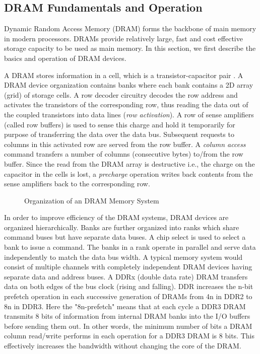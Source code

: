 \subsection{DRAM Fundamentals and Operation} \label{dram-background}
Dynamic Random Access Memory (DRAM) forms the backbone of main memory in modern processors. DRAMs provide relatively large, fast and cost effective storage capacity to be used as main memory. In this section, we first describe the basics and operation of DRAM  devices.

\par A DRAM stores information in a cell, which is a transistor-capacitor pair \cite{dram-book}. A DRAM device organization contains banks where each bank contains a 2D array (grid) of storage cells. A row decoder circuitry decodes the row address and activates the transistors of the corresponding row, thus reading the data out of the coupled transistors into data lines (\textit{row activation}). A row of sense amplifiers (called row buffers) is used to sense this charge and hold it temporarily for purpose of transferring the data over the data bus. Subsequent requests to columns in this activated row are served from the row buffer. A \textit{column access} command transfers a number of columns (consecutive bytes) to/from the row buffer. Since the read from the DRAM array is destructive i.e., the charge on the capacitor in the cells is lost, a \textit{precharge} operation writes back contents from the sense amplifiers back to the corresponding row.
\begin{figure}[!htb]
	\centering
	\def\svgwidth{\columnwidth}
	
	\caption{Organization of an DRAM Memory System}
	\label{fig:dram-basics}
\end{figure}
\par In order to improve efficiency of the DRAM systems, DRAM devices are organized hierarchically. Banks are further organized into ranks which share command buses but have separate data buses. A chip select is used to select a bank to issue a command.  The banks in a rank operate in parallel and serve data independently to match the data bus width. A typical memory system would consist of multiple channels with completely independent DRAM devices having separate data and address buses. A DDRx (double data rate) DRAM transfers data on both edges of the bus clock (rising and falling). DDR increases the n-bit prefetch operation in each successive generation of DRAMs from 4n in DDR2 to 8n in DDR3. Here the "8n-prefetch" means that at each cycle a DDR3 DRAM transmits 8 bits of information from internal DRAM banks into the I/O buffers before sending them out. In other words, the minimum number of bits a DRAM column read/write performs in each operation for a DDR3 DRAM is 8 bits. This effectively increases the bandwidth without changing the core of the DRAM.
